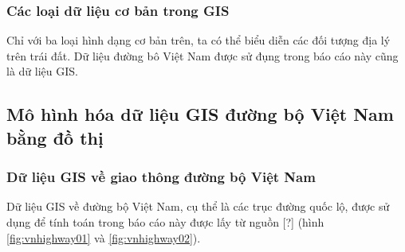 \documentclass[14pt, oneside, a4paper, openany]{scrartcl}
\begin{document}
\subsubsection{Các loại dữ liệu cơ bản trong GIS}
Chỉ với ba loại hình dạng cơ bản trên, ta có thể biểu diễn các đối tượng địa lý trên trái đất. Dữ liệu đường bô Việt Nam được sử đụng trong báo cáo này cũng là dữ liệu GIS.
\subsection{Mô hình hóa dữ liệu GIS đường bộ Việt Nam bằng đồ thị}
\subsubsection{Dữ liệu GIS về giao thông đường bộ Việt Nam}
Dữ liệu GIS về đường bộ Việt Nam, cụ thể là các trục đường quốc lộ, được sử dụng để tính toán trong báo cáo này được lấy từ nguồn [?] (hình \ref{fig:vnhighway01} và \ref{fig:vnhighway02}).
\end{document}
